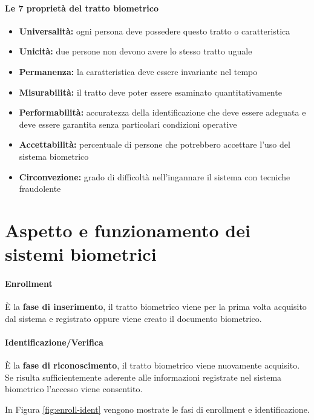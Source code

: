 \documentclass{report}
\begin{document}
\subsubsection{Le 7 proprietà del tratto biometrico}

\begin{itemize}
    \item \textbf{Universalità:} ogni persona deve possedere questo tratto o caratteristica
    \item \textbf{Unicità:} due persone non devono avere lo stesso tratto uguale
    \item \textbf{Permanenza:} la caratteristica deve essere invariante nel tempo
    \item \textbf{Misurabilità:} il tratto deve poter essere esaminato quantitativamente
    \item \textbf{Performabilità:} accuratezza della identificazione che deve essere adeguata e deve essere garantita senza particolari condizioni operative
    \item \textbf{Accettabilità:} percentuale di persone che potrebbero accettare l'uso del sistema biometrico
    \item \textbf{Circonvezione:} grado di difficoltà nell'ingannare il sistema con tecniche fraudolente
\end{itemize}


\chapter{Aspetto e funzionamento dei sistemi biometrici}


\subsubsection{Enrollment}

È la \textbf{fase di inserimento}, il tratto biometrico viene per la prima volta acquisito dal sistema e registrato oppure viene creato il documento biometrico.

\subsubsection{Identificazione/Verifica}

È la \textbf{fase di riconoscimento}, il tratto biometrico viene nuovamente acquisito. Se risulta sufficientemente aderente alle informazioni registrate nel sistema biometrico l'accesso viene consentito.

\noindent In Figura \ref{fig:enroll-ident} vengono mostrate le fasi di enrollment e identificazione.
\end{document}
